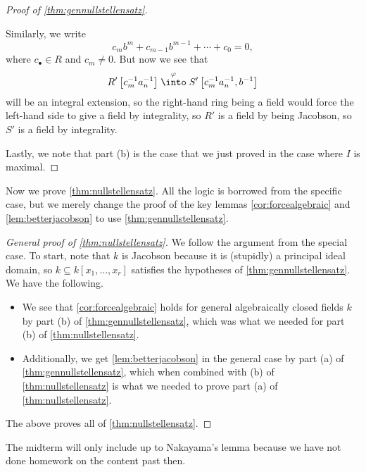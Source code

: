 \begin{proof}[Proof of \autoref{thm:gennullstellensatz}]
\begin{listroman}
		Similarly, we write
		\[c_mb^m+c_{m-1}b^{m-1}+\cdots+c_0=0,\]
		where $c_\bullet\in R$ and $c_m\ne0$. But now we see that
		\[R'\left[c_m^{-1}a_n^{-1}\right]\stackrel\varphi\into S'\left[c_m^{-1}a_n^{-1},b^{-1}\right]\]
		will be an integral extension, so the right-hand ring being a field would force the left-hand side to give a field by integrality, so $R'$ is a field by being Jacobson, so $S'$ is a field by integrality.
	\end{listroman}
	Lastly, we note that part (b) is the case that we just proved in the case where $I$ is maximal.
\end{proof}
\noindent Now we prove \autoref{thm:nullstellensatz}. All the logic is borrowed from the specific case, but we merely change the proof of the key lemmas \autoref{cor:forcealgebraic} and \autoref{lem:betterjacobson} to use \autoref{thm:gennullstellensatz}.
\begin{proof}[General proof of \autoref{thm:nullstellensatz}]
	We follow the argument from the special case. To start, note that $k$ is Jacobson because it is (stupidly) a principal ideal domain, so $k\subseteq k[x_1,\ldots,x_r]$ satisfies the hypotheses of \autoref{thm:gennullstellensatz}. We have the following.
	\begin{itemize}
		\item We see that \autoref{cor:forcealgebraic} holds for general algebraically closed fields $k$ by part (b) of \autoref{thm:gennullstellensatz}, which was what we needed for part (b) of \autoref{thm:nullstellensatz}.
		\item Additionally, we get \autoref{lem:betterjacobson} in the general case by part (a) of \autoref{thm:gennullstellensatz}, which when combined with (b) of \autoref{thm:nullstellensatz} is what we needed to prove part (a) of \autoref{thm:nullstellensatz}.
	\end{itemize}
	The above proves all of \autoref{thm:nullstellensatz}.
\end{proof}
\begin{remark}
	The midterm will only include up to Nakayama's lemma because we have not done homework on the content past then.
\end{remark}

